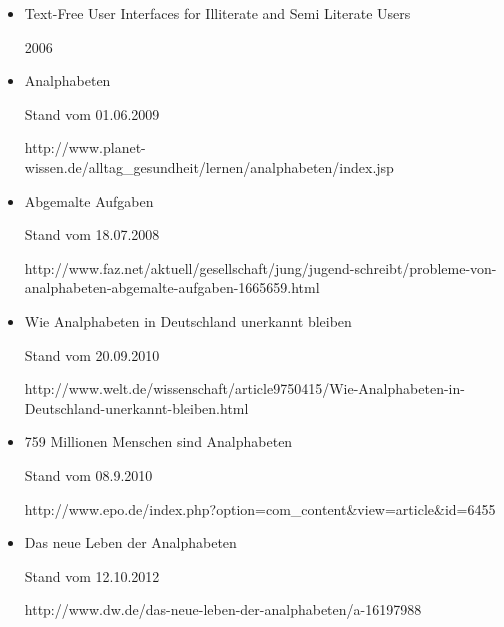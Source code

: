 \begin{itemize}
 	 \item {}

					{Text-Free User Interfaces for Illiterate and Semi Literate Users}

										{2006}

										{}



	\item {}

										{Analphabeten}

										{Stand vom 01.06.2009}

										{http://www.planet-wissen.de/alltag_gesundheit/lernen/analphabeten/index.jsp}

										


	\item {}

										{Abgemalte Aufgaben}

										{Stand vom 18.07.2008}

										{http://www.faz.net/aktuell/gesellschaft/jung/jugend-schreibt/probleme-von-analphabeten-abgemalte-aufgaben-1665659.html}									


	\item {}

										{Wie Analphabeten in Deutschland unerkannt bleiben}

										{Stand vom 20.09.2010}

										{http://www.welt.de/wissenschaft/article9750415/Wie-Analphabeten-in-Deutschland-unerkannt-bleiben.html}	


	\item {}

										{759 Millionen Menschen sind Analphabeten}

										{Stand vom 08.9.2010}

										{http://www.epo.de/index.php?option=com_content&view=article&id=6455}										


	\item {}

										{Das neue Leben der Analphabeten }

										{Stand vom 12.10.2012}

										{http://www.dw.de/das-neue-leben-der-analphabeten/a-16197988}										



\end{itemize}
